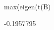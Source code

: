 \begin{Schunk}
\begin{Sinput}
 max(eigen(t(B) %*% B)$values) - 1
\end{Sinput}
\begin{Soutput}
[1] -0.1957795
\end{Soutput}
\end{Schunk}
